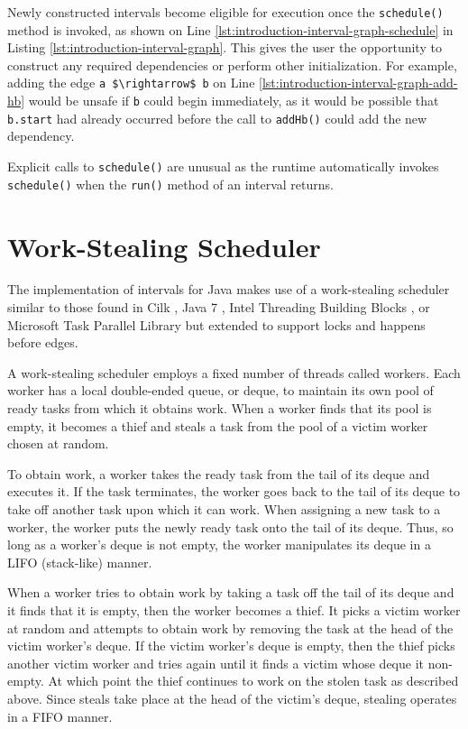 Newly constructed intervals become eligible for execution once the
\lstinline!schedule()! method is invoked, as shown on Line
\ref{lst:introduction-interval-graph-schedule} in Listing
\ref{lst:introduction-interval-graph}. This gives the user the
opportunity to construct any required dependencies or perform other
initialization. For example, adding the edge
\lstinline!a $\rightarrow$ b! on Line
\ref{lst:introduction-interval-graph-add-hb} would be unsafe if
\lstinline!b! could begin immediately, as it would be possible that
\lstinline!b.start! had already occurred before the call to
\lstinline!addHb()! could add the new dependency.

Explicit calls to \lstinline!schedule()! are unusual as the runtime
automatically invokes \lstinline!schedule()! when the
\lstinline!run()! method of an interval returns.


\section{Work-Stealing Scheduler}
\label{sec:intro-work-stealing-scheduler}

The implementation of intervals for Java makes use of a work-stealing
scheduler similar to those found in Cilk \cite{Blumofe1995,
  Frigo1998}, Java 7 \cite{Lea2000, Lea2000a, Lea2004, Lea2006}, Intel
Threading Building Blocks \cite{Reinders2007, Contreras2008}, or
Microsoft Task Parallel Library \cite{Leijen2009} but extended to
support locks and happens before edges.

A work-stealing scheduler employs a fixed number of threads called
workers. Each worker has a local double-ended queue, or deque, to
maintain its own pool of ready tasks from which it obtains work. When
a worker finds that its pool is empty, it becomes a thief and steals a
task from the pool of a victim worker chosen at random.

To obtain work, a worker takes the ready task from the tail of its
deque and executes it. If the task terminates, the worker goes back to
the tail of its deque to take off another task upon which it can
work. When assigning a new task to a worker, the worker puts the newly
ready task onto the tail of its deque. Thus, so long as a worker's
deque is not empty, the worker manipulates its deque in a LIFO
(stack-like) manner.

When a worker tries to obtain work by taking a task off the tail of
its deque and it finds that it is empty, then the worker becomes a
thief. It picks a victim worker at random and attempts to obtain work
by removing the task at the head of the victim worker's deque. If the
victim worker's deque is empty, then the thief picks another victim
worker and tries again until it finds a victim whose deque it
non-empty. At which point the thief continues to work on the stolen
task as described above. Since steals take place at the head of the
victim's deque, stealing operates in a FIFO manner.

